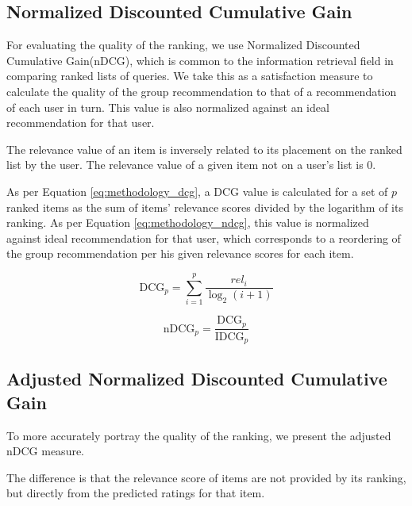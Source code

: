 \subsection{Normalized Discounted Cumulative Gain}
For evaluating the quality of the ranking, we use Normalized Discounted Cumulative Gain(nDCG), which is common to the information retrieval field in comparing ranked lists of queries. We take this as a satisfaction measure to calculate the quality of the group recommendation to that of a recommendation of each user in turn. This value is also normalized against an ideal recommendation for that user.


The relevance value of an item is inversely related to its placement on the ranked list by the user. The relevance value of a given item not on a user's list is 0.

As per Equation \ref{eq:methodology_dcg}, a DCG value is calculated for a set of $p$ ranked items as the sum of items' relevance scores divided by the logarithm of its ranking. As per Equation \ref{eq:methodology_ndcg}, this value is normalized against ideal recommendation for that user, which corresponds to a reordering of the group recommendation per his given relevance scores for each item.

\begin{equation}\label{eq:methodology_dcg}
\text{DCG}_p = \sum_{i=1}^{p}\frac{\textit{rel}_i}{\log_2(i + 1)}
\end{equation}

\begin{equation}\label{eq:methodology_ndcg}
\text{nDCG}_p = \frac{\text{DCG}_p}{\text{IDCG}_p}
\end{equation}

\subsection{Adjusted Normalized Discounted Cumulative Gain}
To more accurately portray the quality of the ranking, we present the adjusted nDCG measure.

The difference is that the relevance score of items are not provided by its ranking, but directly from the predicted ratings for that item.

